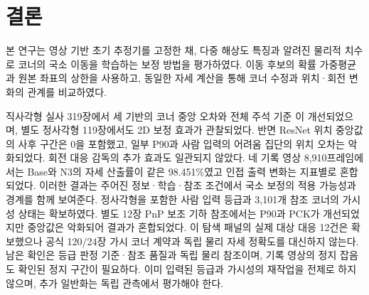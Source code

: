 \section{결론}\label{sec:conclusion}
본 연구는 영상 기반 초기 추정기를 고정한 채, 다중 해상도 특징과 알려진 물리적 치수로 코너의 국소 이동을 학습하는 보정 방법을 평가하였다. 이동 후보의 확률 가중평균과 원본 좌표의 상한을 사용하고, 동일한 자세 계산을 통해 코너 수정과 위치·회전 변화의 관계를 비교하였다.

직사각형 실사 319장에서 세 기반의 코너 중앙 오차와 전체 주석 기준 \pckten 이 개선되었으며, 별도 정사각형 119장에서도 2D 보정 효과가 관찰되었다. 반면 ResNet 위치 중앙값의 사후 구간은 0을 포함했고, 일부 P90과 사람 입력의 어려움 집단의 위치 오차는 악화되었다. 회전 대응 감독의 추가 효과도 일관되지 않았다. 네 기록 영상 8,910프레임에서는 Base와 N3의 자세 산출률이 같은 98.451\%였고 인접 출력 변화는 지표별로 혼합되었다. 이러한 결과는 주어진 정보·학습·참조 조건에서 국소 보정의 적용 가능성과 경계를 함께 보여준다. 정사각형을 포함한 사람 입력 등급과 3,101개 참조 코너의 가시성 상태는 확보하였다. 별도 12장 PnP 보조 기하 참조에서는 P90과 PCK가 개선되었지만 중앙값은 악화되어 결과가 혼합되었다. 이 탐색 패널의 실제 대상 대응 12건은 확보했으나 공식 120/24장 가시 코너 계약과 독립 물리 자세 정확도를 대신하지 않는다. 남은 확인은 등급 판정 기준·참조 품질과 독립 물리 참조이며, 기록 영상의 정지 잡음도 확인된 정지 구간이 필요하다. 이미 입력된 등급과 가시성의 재작업을 전제로 하지 않으며, 추가 일반화는 독립 관측에서 평가해야 한다.
